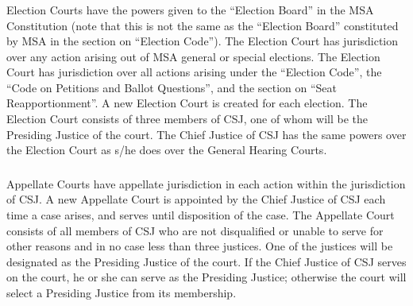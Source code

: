 \subsubsection{}
Election Courts have the powers given to the ``Election Board'' in the MSA Constitution (note that this is not the same as the ``Election Board'' constituted by MSA in the section on ``Election Code'').  The Election Court has jurisdiction over any action arising out of MSA general or special elections.  The Election Court has jurisdiction over all actions arising under the ``Election Code'', the ``Code on Petitions and Ballot Questions'', and the section on ``Seat Reapportionment''.  A new Election Court is created for each election.  The Election Court consists of three members of CSJ, one of whom will be the Presiding Justice of the court.  The Chief Justice of CSJ has the same powers over the Election Court as s/he does over the General Hearing Courts.
\subsubsection{}
Appellate Courts have appellate jurisdiction in each action within the jurisdiction of CSJ.  A new Appellate Court is appointed by the Chief Justice of CSJ each time a case arises, and serves until disposition of the case.  The Appellate Court consists of all members of CSJ who are not disqualified or unable to serve for other reasons and in no case less than three justices.  One of the justices will be designated as the Presiding Justice of the court.  If the Chief Justice of CSJ serves on the court, he or she can serve as the Presiding Justice; otherwise the court will select a Presiding Justice from its membership.
